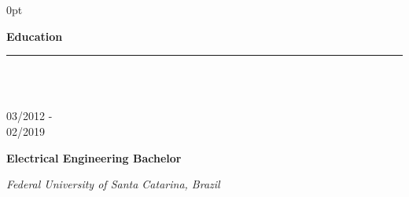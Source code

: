 \documentclass[a4paper]{article}
\begin{document}
\begin{adjustwidth}{\parindent}{0pt}
\begin{minipage}[t]{0.65\textwidth}
\begin{minipage}[t]{0.8\textwidth}
\end{minipage}

\Large{\textbf{Education}} \normalsize \\ \rule{\textwidth}{0.5pt} \\ \\
\begin{minipage}[t]{0.2\textwidth}
\large{03/2012 - \\ 02/2019}
\end{minipage}
\begin{minipage}[t]{0.8\textwidth}
{
  \setlength{\parskip}{5.5pt}
  \Large{\textbf{Electrical Engineering Bachelor}}
  
  \large{\textit{Federal University of Santa Catarina, Brazil}} \\
}
\end{minipage} \\ \\

\end{minipage}
\end{adjustwidth}
\end{document}
